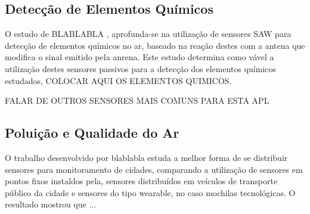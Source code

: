 \subsection{Detecção de Elementos Químicos}

O estudo de BLABLABLA \textcite{akhileshnagpure_2022_water}, aprofunda-se na utilização de sensores SAW para detecção de elementos químicos no ar, baseado na reação destes com a antena que modifica o sinal emitido pela anrena. Este estudo determina como vável a utilização destes sensores passivos para a detecção dos elementos químicos estudados, COLOCAR AQUI OS ELEMENTOS QUIMICOS. 

FALAR DE OUTROS SENSORES MAIS COMUNS PARA ESTA APL

\subsection{Poluição e Qualidade do Ar}

O trabalho desenvolvido por blablabla estuda a melhor forma de se distribuir sensores para monitoramento de cidades, comparando a utilização de sensores em pontos fixos instaldos pela, sensores distribuídos em veículos de transporte público da cidade e sensores do tipo wearable, no caso mochilas tecnológicas. O resultado mostrou que ...




